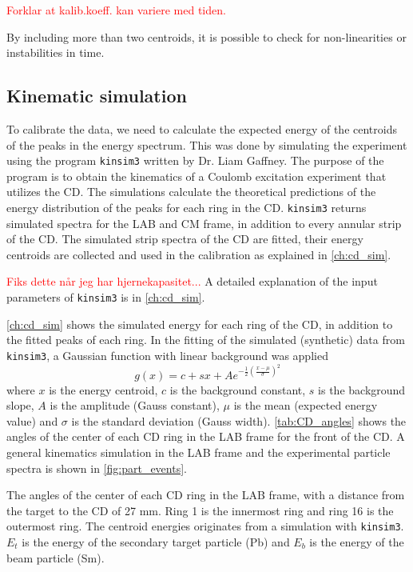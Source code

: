 \documentclass[twoside,english]{uiofysmaster/uiofysmaster}
\let\orgautoref\autoref
\renewcommand{\autoref}
        {%
		 \def\sectionautorefname{Section}%
		 \def\subsectionautorefname{Section}%
		 \def\subsubsectionautorefname{Section}%
		 \def\chapterautorefname{Chapter}%
          \orgautoref}
\begin{document}
\textcolor{red}{Forklar at kalib.koeff. kan variere med tiden.}

By including more than two centroids, it is possible to check for non-linearities or instabilities in time.

\subsection{Kinematic simulation}\label{ssec:kinsim}
To calibrate the data, we need to calculate the expected energy of the centroids of the peaks in the energy spectrum. 
This was done by simulating the experiment using the program \texttt{kinsim3} \cite{kinsim} written by Dr. Liam Gaffney. 
The purpose of the program is to obtain the kinematics of a Coulomb excitation experiment that utilizes the CD. 
The simulations calculate the theoretical predictions of the energy distribution of the peaks for each ring in the CD. 
\texttt{kinsim3} returns simulated spectra for the LAB and CM frame, in addition to every annular strip of the CD.
The simulated strip spectra of the CD are fitted, their energy centroids are collected and used in the calibration as explained in \autoref{ch:cd_sim}.

\textcolor{red}{Fiks dette når jeg har hjernekapasitet...}
A detailed explanation of the input parameters of \texttt{kinsim3} is in \autoref{ch:cd_sim}.

\autoref{ch:cd_sim} shows the simulated energy for each ring of the CD, in addition to the fitted peaks of each ring.
In the fitting of the simulated (synthetic) data from \texttt{kinsim3}, a Gaussian function with linear background was applied
\begin{equation}
	g(x) = c + sx + A e^{-\frac{1}{2}\left(\frac{x - \mu}{\sigma}\right)^2}
\end{equation}
where $x$ is the energy centroid, $c$ is the background constant, $s$ is the background slope, $A$ is the amplitude (Gauss constant), $\mu$ is the mean (expected energy value) and $\sigma$ is the standard deviation (Gauss width). 
\autoref{tab:CD_angles} shows the angles of the center of each CD ring in the LAB frame for the front of the CD. 
A general kinematics simulation in the LAB frame and the experimental particle spectra is shown in \autoref{fig:part_events}. 

\begin{table}[htb] 
    \centering 
    \caption{The angles of the center of each CD ring in the LAB frame, with a distance from the target to the CD of 27 mm. 
    Ring 1 is the innermost ring and ring 16 is the outermost ring. 
    The centroid energies originates from a simulation with \texttt{kinsim3}. 
    $E_t$ is the energy of the secondary target particle (Pb) and $E_b$ is the energy of the beam particle (Sm).}
	
	\label{tab:CD_angles}
\end{table}
\end{document}
